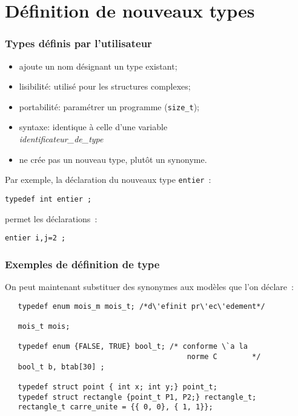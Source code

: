   \section{D\'efinition de nouveaux types}    
\begin{frame}[fragile]
\frametitle{Types d\'efinis par l'utilisateur}
\begin{itemize}
  \item ajoute un nom d\'esignant un type existant;
  \item lisibilit\'e: utilis\'e pour les structures complexes;
  \item portabilit\'e: param\'etrer un programme ({\tt size\_t});
  \item syntaxe: identique \`a celle d'une variable\\
 \hspace*{10mm}{\tt typedef}\hspace{3mm}{\it type}\hspace{3mm} {\it
 identificateur\_de\_type}
  \item ne cr\'ee pas un nouveau type, plut\^ot un synonyme.
\end{itemize}
Par exemple, la d\'eclaration du nouveaux type \verb+entier+~:
\begin{verbatim}
typedef int entier ;
\end{verbatim}
permet les d\'eclarations~:
\begin{verbatim}
entier i,j=2 ;
\end{verbatim}
\end{frame}
 \begin{frame}[fragile]
 \frametitle{Exemples de d\'efinition de type}
 On peut maintenant substituer des synonymes aux mod\`eles que l'on d\'eclare~:
\begin{verbatim}
   typedef enum mois_m mois_t; /*d\'efinit pr\'ec\'edement*/
   
   mois_t mois;

   typedef enum {FALSE, TRUE} bool_t; /* conforme \`a la
                                          norme C        */
   bool_t b, btab[30] ;

   typedef struct point { int x; int y;} point_t;
   typedef struct rectangle {point_t P1, P2;} rectangle_t;
   rectangle_t carre_unite = {{ 0, 0}, { 1, 1}};
\end{verbatim}
\end{frame}
